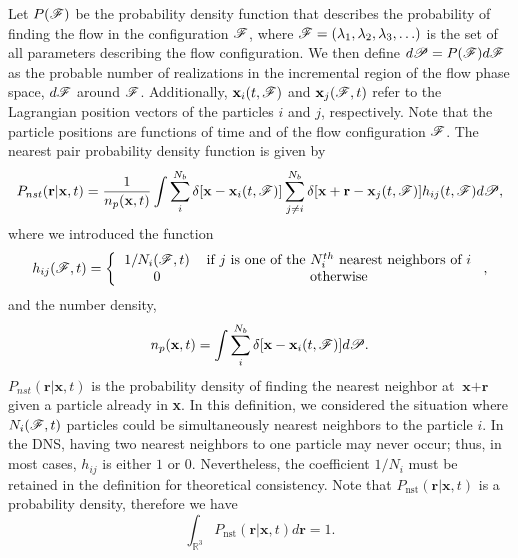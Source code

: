 \documentclass[11pt]{My_preprint}
\begin{document}
Let $P(\mathscr{F})$ be the probability density function that describes the probability of finding the flow in the configuration $\mathscr{F}$, where $\mathscr{F} = (\lambda_1,\lambda_2,\lambda_3,\ldots)$ is the set of all parameters describing the flow configuration.
We then define $d\mathscr{P} = P(\mathscr{F})d\mathscr{F}$ as the probable number of realizations in the incremental region of the flow phase space, $d\mathscr{F}$ around $\mathscr{F}$.
Additionally,  $\textbf{x}_i(t,\mathscr{F})$ and $\textbf{x}_j(\mathscr{F},t)$ refer to the Lagrangian position vectors of the particles $i$ and $j$, respectively. 
Note that the particle positions are functions of time and of the flow configuration $\mathscr{F}$. 
The nearest pair probability density function is given by \citep{zhang2021ensemble,zhang2023evolution}
\begin{equation}
    P_{nst}(\textbf{r}|\textbf{x},t)= \frac{1}{n_p(\textbf{x},t)}
    \int \sum_{i}^{N_b}\delta[\textbf{x}-\textbf{x}_i(t,\mathscr{F})]
    \sum_{j\neq i}^{N_b}\delta[\textbf{x}+\textbf{r}-\textbf{x}_j(t,\mathscr{F})]
h_{ij} (t,\mathscr{F})
    d\mathscr{P},
    \label{eq:P_nstij}
\end{equation}
where we introduced the function 
\begin{equation*}
    h_{ij}(\FF,t)
    = \left\{
        \begin{tabular}{cc}
            $1/N_i(\FF,t)$ & if $j$ is one of the $N^{th}_i$ nearest neighbors of $i$ \\
            0& otherwise
        \end{tabular}
        \right. ,
\end{equation*}
and the number density, 
\begin{equation}
    n_p(\textbf{x},t)= 
    \int \sum_{i}^{N_b}\delta[\textbf{x}-\textbf{x}_i(t,\mathscr{F})] d\mathscr{P}.
    \label{eq:n_p}
\end{equation}
$P_{nst}(\textbf{r}|\textbf{x},t)$ is the probability density of finding the nearest neighbor at $\textbf{x}+\textbf{r}$ given a particle already in \textbf{x}.
In this definition, we considered the situation where $N_i(\mathscr{F},t)$ particles could be simultaneously nearest neighbors to the particle $i$. 
In the DNS, having two nearest neighbors to one particle may never occur; thus, in most cases, $h_{ij}$ is either $1$ or $0$. 
Nevertheless, the coefficient $1/N_i$ must be retained in the definition for theoretical consistency.
Note that $P_\text{nst}(\textbf{r}|\textbf{x},t)$ is a probability density, therefore we have
\begin{equation*}
    \int_{\mathbb{R}^3}
     P_\text{nst}(\textbf{r}|\textbf{x},t) d\textbf{r}  = 1. 
    \label{eq:Pnst}
\end{equation*}
\end{document}
